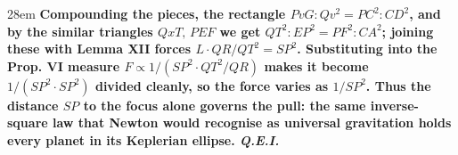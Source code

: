 \documentclass[border=4pt]{standalone}
\begin{document}
\begin{varwidth}{28em}
\large\bfseries
Compounding the pieces, the rectangle $PvG : Qv^2 = PC^2 : CD^2$, and by the      similar triangles $QxT,\,PEF$ we get $QT^2 : EP^2 = PF^2 : CA^2$; joining these      with Lemma XII forces \textcolor{resultblue}{$L\cdot QR / QT^2 = SP^2$}. Substituting into      the Prop. VI measure $F \propto 1/(SP^2 \cdot QT^2/QR)$ makes it become      $1/(SP^2\cdot SP^2)$ divided cleanly, so the \textcolor{resultblue}{force varies as      $1/SP^2$}. Thus the \textcolor{radgreen}{distance $SP$} to the focus alone governs the pull:      the same \textcolor{resultblue}{inverse-square law} that Newton would recognise as universal      gravitation holds every planet in its \textcolor{ellblue}{Keplerian ellipse}. \textit{Q.E.I.}
\end{varwidth}
\end{document}
